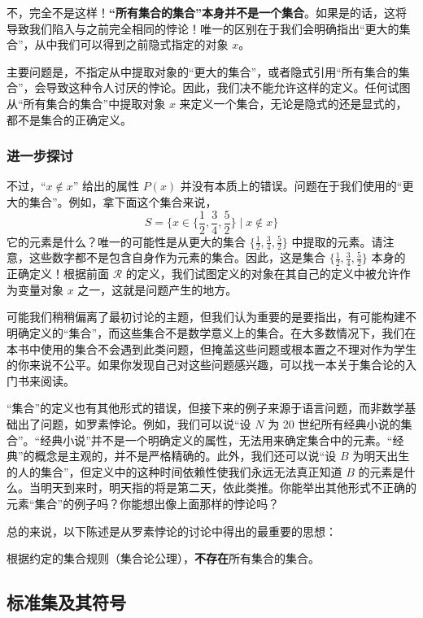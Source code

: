 不，完全不是这样！\textbf{``所有集合的集合''本身并不是一个集合}。如果是的话，这将导致我们陷入与之前完全相同的悖论！唯一的区别在于我们会明确指出``更大的集合''，从中我们可以得到之前隐式指定的对象 $x$。

主要问题是，不指定从中提取对象的``更大的集合''，或者隐式引用``所有集合的集合''，会导致这种令人讨厌的悖论。因此，我们决不能允许这样的定义。任何试图从``所有集合的集合''中提取对象 $x$ 来定义一个集合，无论是隐式的还是显式的，都不是集合的正确定义。

\subsubsection*{进一步探讨}

不过，``$x \notin x$'' 给出的属性 $P(x)$ 并没有本质上的错误。问题在于我们使用的``更大的集合''。例如，拿下面这个集合来说，
\[S = \Bigg\{x \in \bigg\{\frac{1}{2}, \frac{3}{4}, \frac{5}{2}\bigg\} \mid x \notin x \Bigg\}\]
它的元素是什么？唯一的可能性是从更大的集合 $\{\frac{1}{2}, \frac{3}{4}, \frac{5}{2}\}$ 中提取的元素。请注意，这些数字都不是包含自身作为元素的集合。因此，这是集合 $\{\frac{1}{2}, \frac{3}{4}, \frac{5}{2}\}$ 本身的正确定义！根据前面 $\mathcal{R}$ 的定义，我们试图定义的对象在其自己的定义中被允许作为变量对象 $x$ 之一，这就是问题产生的地方。

可能我们稍稍偏离了最初讨论的主题，但我们认为重要的是要指出，有可能构建不明确定义的``集合''，而这些集合不是数学意义上的集合。在大多数情况下，我们在本书中使用的集合不会遇到此类问题，但掩盖这些问题或根本置之不理对作为学生的你来说不公平。如果你发现自己对这些问题感兴趣，可以找一本关于集合论的入门书来阅读。

``集合''的定义也有其他形式的错误，但接下来的例子来源于语言问题，而非数学基础出了问题，如罗素悖论。例如，我们可以说``设 $N$ 为 20 世纪所有经典小说的集合''。``经典小说''并不是一个明确定义的属性，无法用来确定集合中的元素。``经典''的概念是主观的，并不是严格精确的。此外，我们还可以说``设 $B$ 为明天出生的人的集合''，但定义中的这种时间依赖性使我们永远无法真正知道 $B$ 的元素是什么。当明天到来时，明天指的将是第二天，依此类推。你能举出其他形式不正确的元素``集合''的例子吗？你能想出像上面那样的悖论吗？

总的来说，以下陈述是从罗素悖论的讨论中得出的最重要的思想：

\begin{center}根据约定的集合规则（集合论公理），\textbf{不存在}所有集合的集合。\end{center}

\subsection{标准集及其符号}


